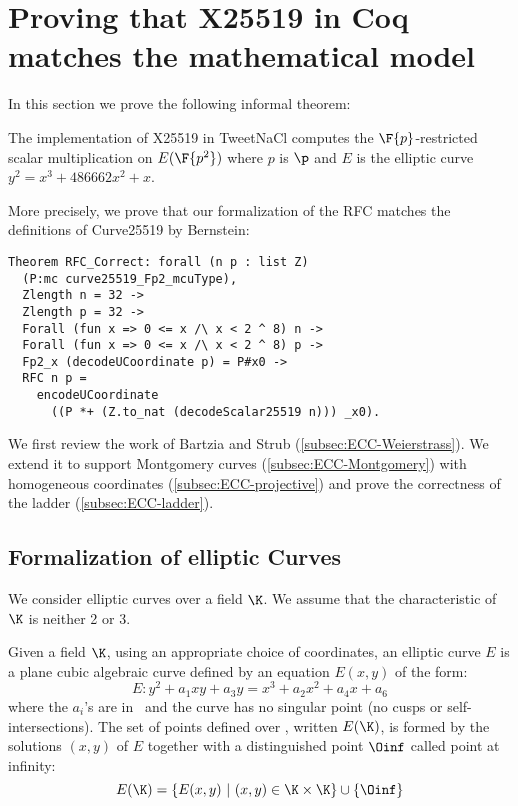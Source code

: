 \section{Proving that X25519 in Coq matches the mathematical model}
\label{sec:maths}

In this section we prove the following informal theorem:

\begin{informaltheorem}
The implementation of X25519 in TweetNaCl computes the
$\F{p}$-restricted \xcoord scalar multiplication on $E(\F{p^2})$ where $p$ is $\p$
and $E$ is the elliptic curve $y^2 = x^3 + 486662 x^2 + x$.
\end{informaltheorem}

More precisely, we prove that our formalization of the RFC matches the definitions of Curve25519 by Bernstein:
\begin{lstlisting}[language=Coq]
Theorem RFC_Correct: forall (n p : list Z)
  (P:mc curve25519_Fp2_mcuType),
  Zlength n = 32 ->
  Zlength p = 32 ->
  Forall (fun x => 0 <= x /\ x < 2 ^ 8) n ->
  Forall (fun x => 0 <= x /\ x < 2 ^ 8) p ->
  Fp2_x (decodeUCoordinate p) = P#x0 ->
  RFC n p =
    encodeUCoordinate
      ((P *+ (Z.to_nat (decodeScalar25519 n))) _x0).
\end{lstlisting}

We first review the work of Bartzia and Strub \cite{BartziaS14} (\ref{subsec:ECC-Weierstrass}).
We extend it to support Montgomery curves (\ref{subsec:ECC-Montgomery})
with homogeneous coordinates (\ref{subsec:ECC-projective}) and prove the
correctness of the ladder (\ref{subsec:ECC-ladder}).

\subsection{Formalization of elliptic Curves}
\label{subsec:ECC}

We consider elliptic curves over a field $\K$. We assume that the
characteristic of $\K$ is neither 2 or 3.

\begin{dfn}
Given a field $\K$,
using an appropriate choice of coordinates,
an elliptic curve $E$
is a plane cubic algebraic curve defined by an equation $E(x,y)$ of the form:
$$E : y^2 + a_1 xy + a_3 y = x^3 + a_2 x^2 + a_4 x + a_6$$
where the $a_i$'s are in \K\ and the curve has no singular point (\ie no cusps
or self-intersections). The set of points defined over \K, written $E(\K)$, is formed by the
solutions $(x,y)$ of $E$ together with a distinguished point $\Oinf$ called point at infinity:
$$E(\K) = \{ E(x,y)~|~(x,y) \in \K \times \K\} \cup \{\Oinf\}$$
\end{dfn}

